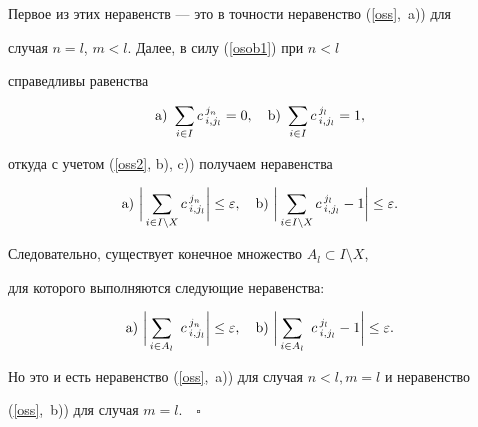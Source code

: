 Первое из этих неравенств --- это в точности неравенство (\ref{oss},~a)) для


случая $n=l$, $m<l$. Далее, в силу (\ref{osob1}) при $n<l$


справедливы равенства


$$






\mathrm a)\ \sumi c\,^{j_n}_{i,j_l}=0,\quad


\mathrm b) \ \sumi c\,^{j_l}_{i,j_l}=1,




$$


откуда с учетом (\ref{oss2}, b), c)) получаем неравенства


$$






\mathrm a)\ \bigg | \sum_{i \in I \setminus X}


c\,^{j_n}_{i,j_l} \bigg | \le \ep, \quad


\mathrm b) \ \bigg | \sum_{i \in I \setminus X}


c\,^{j_l}_{i,j_l} -1\bigg |\le \ep.




$$


Следовательно, существует конечное множество $A_l \subset I \setminus X$,


для которого выполняются следующие неравенства:


$$






\mathrm a)\ \bigg | \sum_{i \in A_l} \,\, c\,^{j_n}_{i,j_l} \bigg | \le \ep,


\quad \mathrm b) \ \bigg | \sum_{i \in A_l} \,\, c\,^{j_l}_{i,j_l} -1\bigg |


\le \ep.




$$


Но это и есть неравенство (\ref{oss},~a)) для случая $n <l,m=l$ и неравенство


(\ref{oss},~b)) для случая $m=l$.$\quad\square$


